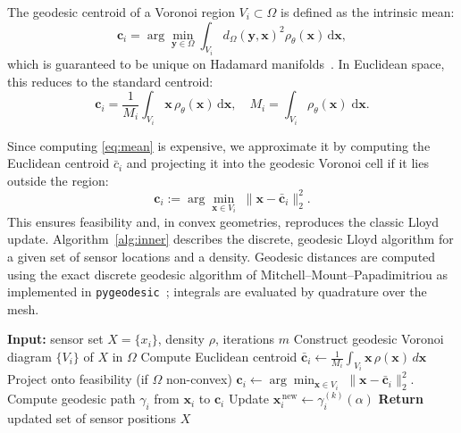 \documentclass[onefignum,onetabnum]{siamart171218} %
\begin{document}
The geodesic centroid of a Voronoi region \( V_i \subset \Omega \) is defined as the intrinsic mean:
\begin{equation}
  \label{eq:mean}
  \mathbf{c}_{i}
  =
  \arg\min_{\mathbf{y} \in \Omega}
  \int_{V_{i}}
    d_{\Omega}(\mathbf{y},\mathbf{x})^{2}\rho_{\theta}(\mathbf{x})
    \,\mathrm{d}\mathbf{x},
\end{equation}
which is guaranteed to be unique on Hadamard manifolds~\cite{afsari2011riemannian}. In Euclidean space, this reduces to the standard centroid:
\[
    \label{eq:centroid}
    \mathbf{c}_i = \frac{1}{M_i} \int_{V_i} \mathbf{x}\, \rho_\theta(\mathbf{x})\, \mathrm{d}\mathbf{x}, \quad M_i = \int_{V_i} \rho_\theta(\mathbf{x})\;\mathrm{d}\mathbf{x}.
\]

Since computing \eqref{eq:mean} is expensive, we approximate it by computing the Euclidean centroid \( \bar{c}_i \) and projecting it into the geodesic Voronoi cell if it lies outside the region:
\begin{equation}
    \label{eq:projected-centroid}
    \mathbf{c}_i := \arg\min_{\mathbf{x} \in V_i} \; \| \mathbf{x} - \bar{\mathbf{c}}_i \|_2^2.
\end{equation}
This ensures feasibility and, in convex geometries, reproduces the classic Lloyd update. Algorithm~\ref{alg:inner} describes the discrete, geodesic Lloyd algorithm for a given set of sensor locations and a density.
Geodesic distances are computed using the exact discrete geodesic algorithm of Mitchell–Mount–Papadimitriou as implemented in \texttt{pygeodesic}~\cite{mitchell1987discrete}; integrals are evaluated by quadrature over the mesh.


\begin{algorithm}[H]
\caption{\textsc{DiscreteLloyd}\,$(X,\rho,M,\alpha)$}
\label{alg:inner}
\begin{algorithmic}[1]
\State \textbf{Input:}
       sensor set $X=\{x_i\}$,\; density $\rho$,\; iterations $m$
    \State Construct geodesic Voronoi diagram
           $\{V_i\}$ of $X$ in $\Omega$
        \State Compute Euclidean centroid
               $\bar{\mathbf{c}}_i\gets\frac{1}{M_i}
               \displaystyle\int_{V_i}\!\mathbf{x}\,\rho(\mathbf{x})\,d\mathbf{x}$
        \State Project onto feasibility (if $\Omega$ non-convex)
                $\mathbf{c}_i \gets \arg\min_{\mathbf{x} \in V_i} \; \| \mathbf{x} - \bar{\mathbf{c}}_i \|_2^2.$
        \State Compute geodesic path
                $\gamma_i$ from $\mathbf{x}_i$ to $\mathbf{c}_i$
        \State Update
                $\mathbf{x}_i^{\,\text{new}}
                \gets
                \gamma_i^{(k)}(\alpha)$
    \EndFor
\EndFor
\State \textbf{Return} updated set of sensor positions $X$
\end{algorithmic}
\end{algorithm}
\end{document}
